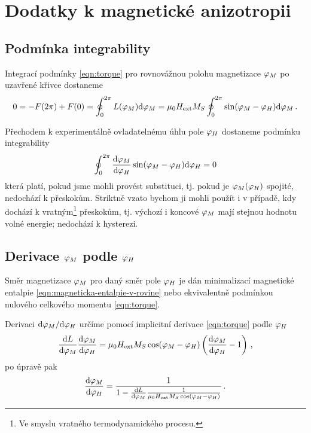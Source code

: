 \section{Dodatky k magnetické anizotropii}
\label{app:magneticka-anizotropie}

\subsection*{Podmínka integrability}

Integrací podmínky \eqref{eqn:torque} pro rovnovážnou polohu magnetizace $\varphi_M$ po uzavřené křivce dostaneme
\begin{equation}
    0 = - F(2\pi) + F(0) = \oint_0^{2\pi} L(\varphi_M) \textrm{d}\varphi_M = \mu_0 H_\textrm{ext} M_S \oint_0^{2\pi} \sin(\varphi_M-\varphi_H) \textrm{d}\varphi_M \,.
\end{equation}

Přechodem k experimentálně ovladatelnému úhlu pole $\varphi_H$ dostaneme podmínku integrability
\begin{equation}
    \oint_0^{2\pi} \frac{\textrm{d}\varphi_M}{\textrm{d}\varphi_H}\sin(\varphi_M-\varphi_H)\textrm{d}\varphi_H = 0
\end{equation}
která platí, pokud jsme mohli provést substituci, tj. pokud je $\varphi_M(\varphi_H)$ spojité, nedochází k přeskokům.
Striktně vzato bychom ji mohli použít i v případě, kdy dochází k vratným\footnote{Ve smyslu vratného termodynamického procesu.} přeskokům, tj. výchozí i koncové $\varphi_M$ mají stejnou hodnotu volné energie; nedochází k hysterezi.

\subsection*{Derivace $\varphi_M$ podle $\varphi_H$}

Směr magnetizace $\varphi_M$ pro daný směr pole $\varphi_H$ je dán minimalizací magnetické entalpie \eqref{eqn:magneticka-entalpie-v-rovine} nebo ekvivalentně podmínkou nulového celkového momentu \eqref{eqn:torque}.

Derivaci $\textrm{d}\varphi_M/\textrm{d}\varphi_H$ určíme pomocí implicitní derivace \eqref{eqn:torque} podle $\varphi_H$
\begin{equation}
    \frac{\textrm{d}L}{\textrm{d}\varphi_M}\frac{\textrm{d}\varphi_M}{\textrm{d}\varphi_H} = \mu_0H_\textrm{ext} M_S \cos(\varphi_M-\varphi_H)\left( \frac{\textrm{d}\varphi_M}{\textrm{d}\varphi_H} - 1  \right) \,,
\end{equation}
po úpravě pak 
\begin{equation}
    \label{eqn:app-integrabilita}
    \frac{\textrm{d}\varphi_M}{\textrm{d}\varphi_H} = \frac{1}{1-\frac{\textrm{d}L}{\textrm{d}\varphi_M}\frac{1}{\mu_0H_\textrm{ext} M_S \cos(\varphi_M-\varphi_H)}} \,.
\end{equation}

